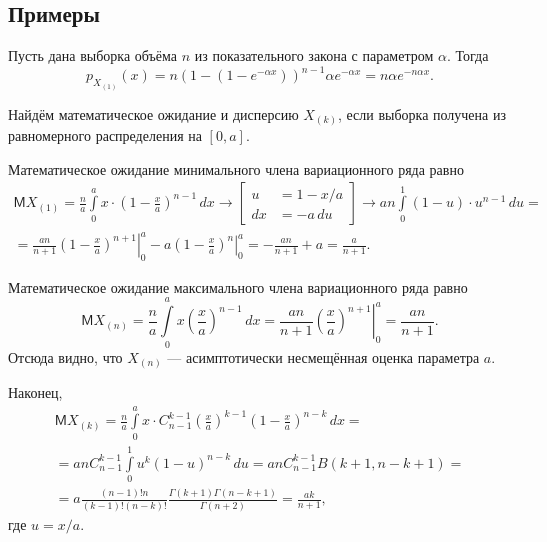 \subsection{Примеры}
\begin{ex}
	Пусть дана выборка объёма $ n $ из показательного закона с параметром $ \alpha
	$. Тогда
	\[
		p_{X_{(1)}}(x) = n(1 - (1 - e^{-\alpha x}))^{n-1} \alpha e^{-\alpha
		x} = n \alpha e^{-n\alpha x}.
	\]
\end{ex}
\begin{ex}
	Найдём математическое ожидание и дисперсию $ X_{(k)} $, если выборка получена
	из равномерного распределения на $ [0, a] $. 

	Математическое ожидание минимального члена вариационного ряда равно
	\begin{multline*}
		\mathsf M X_{(1)} = \frac{n}{a }\int\limits_{0}^{a} x\cdot \left( 1 - \frac{x}{a}
		\right)^{n-1}\,dx \to \left[ \begin{aligned} u &= 1 - x/a \\ dx &= -a\,du
		\end{aligned}\right] \to an \int\limits_{0}^{1} \left( 1 - u \right) \cdot
		u^{n-1}\,du =\\=
		\frac{an}{n+1} \left. \left( 1 - \frac{x}{a} \right)^{n+1} \right|^a_0 - a
			\left.\left( 1 - \frac{x}{a} \right)^n \right|^a_0 = - \frac{an}{n+1} + a
				= \frac{a}{n+1}.
	\end{multline*}
	
	Математическое ожидание максимального члена вариационного ряда равно 
	\[
	\mathsf M X_{(n)} = \frac{n}{a}\int\limits_{0}^{a} x
	\left(\frac{x}{a}\right)^{n-1}\,dx = \frac{an}{n+1} \left.\left( \frac{x}{a}
	\right)^{n+1} \right|^a_0 = \frac{an}{n+1}.
	\]
	Отсюда видно, что $ X_{(n)} $ --- асимптотически несмещённая оценка параметра
	$ a $.

	Наконец, 
	\begin{multline*}
		\mathsf M X_{(k)} = \frac{n}{a}\int\limits_{0}^{a} x\cdot C^{k-1}_{n-1}
		\left(\frac{x}{a}\right)^{k-1} \left( 1 - \frac{x}{a} \right)^{n-k}\,dx = \\
		= an C^{k-1}_{n-1} \int\limits_{0}^{1}
		u^k(1-u)^{n-k}\,du = 
		an C^{k-1}_{n-1} B(k+1, n-k+1)  = \\ = a \frac{(n-1)!n}{(k-1)! (n-k)!}
		\frac{\Gamma(k+1) \Gamma(n-k+1)}{\Gamma(n+2)} = \frac{ak}{n+1},
	\end{multline*}
	где $ u = x/a $.
\end{ex}
